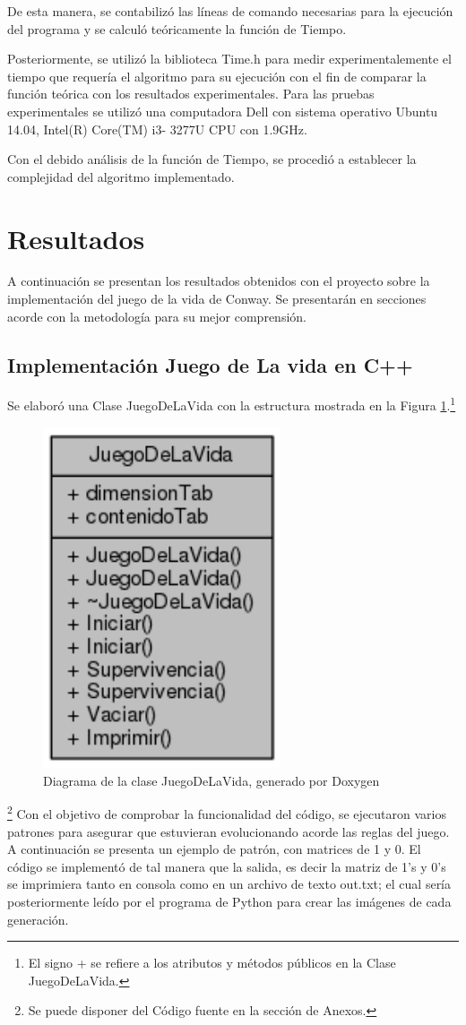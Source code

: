 \documentclass[12pt,letterpaper]{article}
\begin{document}
De esta manera, se contabilizó las líneas de comando necesarias para la ejecución del programa y se calculó teóricamente la función de Tiempo. 

Posteriormente, se utilizó la biblioteca Time.h para medir experimentalemente el tiempo que requería el algoritmo para su ejecución con el fin de comparar la función teórica con los resultados experimentales. Para las pruebas experimentales se utilizó una computadora Dell con sistema operativo Ubuntu 14.04, Intel(R) Core(TM)  i3- 3277U CPU con 1.9GHz. 

Con el debido análisis de la función de Tiempo, se procedió a establecer la complejidad del algoritmo implementado.


\newpage
\section{Resultados}
A continuación se presentan los resultados obtenidos con el proyecto sobre la implementación del juego de la vida de Conway. Se presentarán en secciones acorde con la metodología para su mejor comprensión.

\subsection{Implementación Juego de La vida en C++}
Se elaboró una Clase JuegoDeLaVida con la estructura mostrada en la Figura \ref{UML}.\footnote{El signo + se refiere a los atributos y métodos públicos en la Clase JuegoDeLaVida.} 

\begin{figure}[H]
\centering
\includegraphics[height=10 cm, width=7cm]{img/UML}
\caption{\label{UML} Diagrama de la clase JuegoDeLaVida, generado por Doxygen}
\end{figure}
\footnote{Se puede disponer del Código fuente en la sección de Anexos.}
Con el objetivo de comprobar la funcionalidad del código, se ejecutaron varios patrones para asegurar que estuvieran evolucionando acorde las reglas del juego. A continuación se presenta un ejemplo de patrón, con matrices de 1 y 0. El código se implementó de tal manera que la salida, es decir la matriz de 1's y 0's se imprimiera tanto en consola como en un archivo de texto out.txt; el cual sería posteriormente leído por el programa de Python para crear las imágenes de cada generación. 
\end{document}
